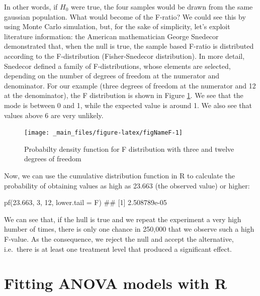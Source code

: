 \documentclass[a4paper,12pt,oneside]{book}
\newenvironment{Shaded}{\begin{snugshade}}{\end{snugshade}}
\newcommand{\DecValTok}[1]{#1}
\newcommand{\FloatTok}[1]{#1}
\newcommand{\DocumentationTok}[1]{#1}
\newcommand{\FunctionTok}[1]{#1}
\newcommand{\AttributeTok}[1]{#1}
\newcommand{\NormalTok}[1]{#1}
\begin{document}
In other words, if \(H_0\) were true, the four samples would be drawn from the same gaussian population. What would become of the F-ratio? We could see this by using Monte Carlo simulation, but, for the sake of simplicity, let's exploit literature information: the American mathematician George Snedecor demonstrated that, when the null is true, the sample based F-ratio is distributed according to the F-distribution (Fisher-Snedecor distribution). In more detail, Snedecor defined a family of F-distributions, whose elements are selected, depending on the number of degrees of freedom at the numerator and denominator. For our example (three degrees of freedom at the numerator and 12 at the denominator), the F distribution is shown in Figure \ref{fig:figNameF}. We see that the mode is between 0 and 1, while the expected value is around 1. We also see that values above 6 are very unlikely.

\begin{figure}

{\centering \texttt{[image: \_main\_files/figure-latex/figNameF-1]} 

}

\caption{Probabilty density function for F distribution with three and twelve degrees of freedom}\label{fig:figNameF}
\end{figure}

Now, we can use the cumulative distribution function in R to calculate the probability of obtaining values as high as 23.663 (the observed value) or higher:

\vspace{12pt}

\begin{Shaded}
\begin{Highlighting}[]
\FunctionTok{pf}\NormalTok{(}\FloatTok{23.663}\NormalTok{, }\DecValTok{3}\NormalTok{, }\DecValTok{12}\NormalTok{, }\AttributeTok{lower.tail =}\NormalTok{ F)}
\DocumentationTok{\#\# [1] 2.508789e{-}05}
\end{Highlighting}
\end{Shaded}

We can see that, if the hull is true and we repeat the experiment a very high humber of times, there is only one chance in 250,000 that we observe such a high F-value. As the consequence, we reject the null and accept the alternative, i.e.~there is at least one treatment level that produced a significant effect.

\hypertarget{fitting-anova-models-with-r}{%
\section{Fitting ANOVA models with R}\label{fitting-anova-models-with-r}}
\end{document}
